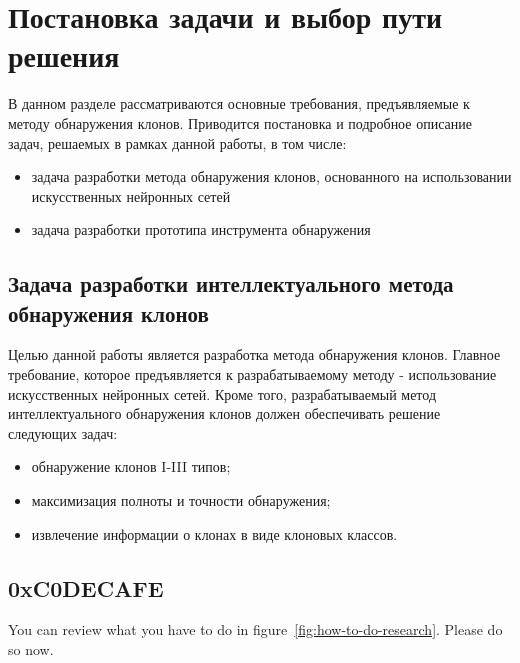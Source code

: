 \chapter{Постановка задачи и выбор пути решения}

В данном разделе рассматриваются основные требования, предъявляемые к методу обнаружения клонов. Приводится постановка и подробное описание задач, решаемых в рамках данной работы, в том числе:
\begin{itemize}
\setlength\itemsep{0mm}
\item задача разработки метода обнаружения клонов, основанного на использовании искусственных нейронных сетей
\item задача разработки прототипа инструмента обнаружения
\end{itemize}
\section{Задача разработки интеллектуального метода обнаружения клонов}

Целью данной работы является разработка метода обнаружения клонов. Главное требование, которое предъявляется к разрабатываемому методу - использование искусственных нейронных сетей. Кроме того, разрабатываемый метод интеллектуального обнаружения клонов должен обеспечивать решение следующих задач:
\begin{itemize}
\setlength\itemsep{0mm}
\item обнаружение клонов I-III типов;
\item максимизация полноты и точности обнаружения;
\item извлечение информации о клонах в виде клоновых классов.
\end{itemize}



\section{0xC0DECAFE}

You can review what you have to do in figure~\ref{fig:how-to-do-research}.
Please do so now. \blindtext

\Blindtext

